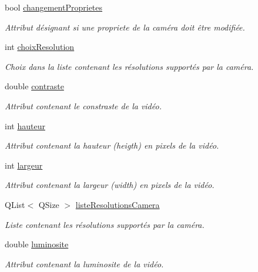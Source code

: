\begin{DoxyCompactItemize}
\item 
bool \hyperlink{class_camera_a50d2b3ef5c08f8b61bbe2115d71005bd}{changement\+Proprietes}
\begin{DoxyCompactList}\small\item\em Attribut désignant si une propriete de la caméra doit être modifiée. \end{DoxyCompactList}\item 
int \hyperlink{class_camera_a3fdddf6f548f04d7bdc26f32602a03d4}{choix\+Resolution}
\begin{DoxyCompactList}\small\item\em Choix dans la liste contenant les résolutions supportés par la caméra. \end{DoxyCompactList}\item 
double \hyperlink{class_camera_ad3b300e52c91341d985d3b54f562a0f7}{contraste}
\begin{DoxyCompactList}\small\item\em Attribut contenant le constraste de la vidéo. \end{DoxyCompactList}\item 
int \hyperlink{class_camera_a5d89d7f9d1a5eab4175dd168c7fbf1c7}{hauteur}
\begin{DoxyCompactList}\small\item\em Attribut contenant la hauteur (heigth) en pixels de la vidéo. \end{DoxyCompactList}\item 
int \hyperlink{class_camera_ad64f26cdfc5aa561208b273d430938cf}{largeur}
\begin{DoxyCompactList}\small\item\em Attribut contenant la largeur (width) en pixels de la vidéo. \end{DoxyCompactList}\item 
Q\+List$<$ Q\+Size $>$ \hyperlink{class_camera_a96af62eaf7828664865b56e7c69e771c}{liste\+Resolutions\+Camera}
\begin{DoxyCompactList}\small\item\em Liste contenant les résolutions supportés par la caméra. \end{DoxyCompactList}\item 
double \hyperlink{class_camera_aca5433bf19773161142d73009469b1ed}{luminosite}
\begin{DoxyCompactList}\small\item\em Attribut contenant la luminosite de la vidéo. \end{DoxyCompactList}\item 

\end{DoxyCompactItemize}
